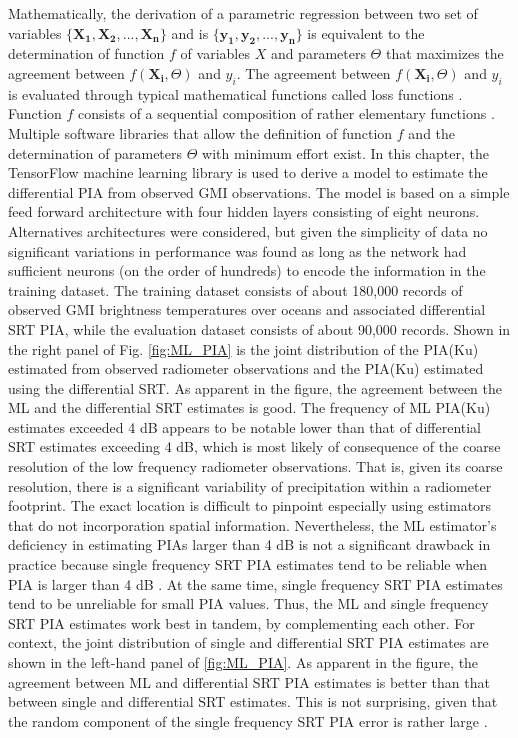 \documentclass[10pt]{ietbook}
\begin{document}
Mathematically, the derivation of a parametric regression between two set of variables $\{\mathbf{X_1,X_2,...,X_n}\}$ and is $\{\mathbf{y_1,y_2,...,y_n}\}$ is 
equivalent to the determination of function $f$ of variables $X$ and parameters $\Theta$ that maximizes the agreement between $f(\mathbf{ X_i},\Theta)$ and $y_i$.
The agreement between $f(\mathbf{ X_i},\Theta)$ and $y_i$ is evaluated through typical mathematical functions called loss functions \cite{deeplearning2016}.
Function $f$ consists of a sequential composition of rather elementary functions \cite{deeplearning2016}.
Multiple software libraries that allow the definition of function $f$ and the determination of parameters $\Theta$ with minimum effort exist.  In this 
chapter, the TensorFlow machine learning library \cite{tensorflow2015} is used to derive a model to estimate the differential PIA from observed GMI observations.
The model is based on a simple feed forward architecture with four hidden layers consisting of eight neurons. Alternatives architectures were considered,
but given the simplicity of data no significant variations in performance was found as long as the network had sufficient neurons (on the order of hundreds)
to encode the information in the training dataset.  The training dataset consists of about 180,000 records of observed GMI brightness temperatures over 
oceans and associated differential SRT PIA, while the evaluation dataset consists of about 90,000 records.  Shown in the right panel of Fig. \ref{fig:ML_PIA} 
is the joint distribution of the PIA(Ku) estimated from observed radiometer observations and the PIA(Ku) estimated using the differential SRT. As apparent
in the figure, the agreement between the ML and the differential SRT estimates is good.  The frequency of ML PIA(Ku) estimates exceeded 4 dB appears to be
notable lower than that of differential SRT estimates exceeding 4 dB, which is most likely of consequence of the coarse resolution of the low frequency
radiometer observations.  That is, given its coarse resolution, there is a significant variability of precipitation within a radiometer footprint.  The exact
location is difficult to pinpoint especially using estimators that do not incorporation spatial information.  Nevertheless, the ML estimator's deficiency
in estimating PIAs larger than 4 dB is not a significant drawback in practice because single frequency SRT PIA estimates tend to be reliable when PIA is larger
than 4 dB  \cite{meneghini2000}.  At the same time, single frequency SRT PIA estimates tend to be unreliable for small PIA values.  Thus, the ML and single frequency SRT PIA estimates 
work best in tandem, by complementing each other.  For context, the joint distribution of single and differential SRT PIA estimates are shown in the left-hand
panel of \ref{fig:ML_PIA}.  As apparent in the figure, the agreement between ML and differential SRT PIA estimates is better than that between 
single and differential SRT estimates.  This is not surprising, given that the random component of the single frequency SRT PIA error is rather large 
\cite{meneghini2000}.
\end{document}
